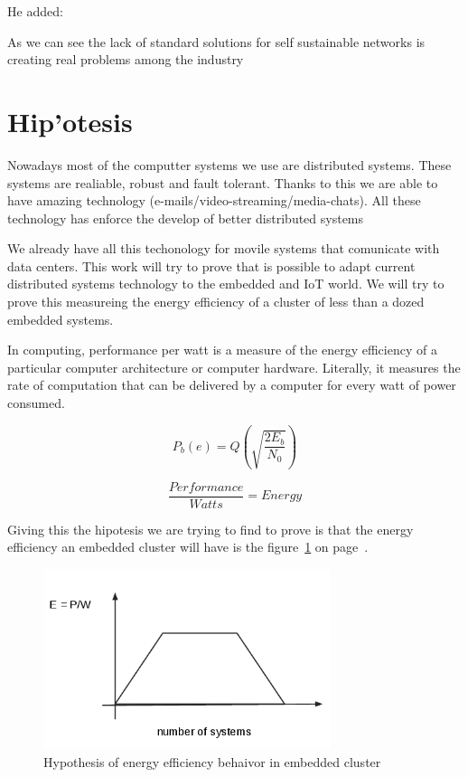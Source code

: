 He added: 


As we can see the lack of standard solutions for self sustainable networks is 
creating real problems among the industry

\section{Hip'otesis}
\noindent

Nowadays most of the computter systems we use are distributed systems. These
systems are realiable, robust and fault tolerant. Thanks to this we are able to
have amazing technology (e-mails/video-streaming/media-chats). All these
technology has enforce the develop of better distributed systems

We already have all this techonology for movile systems that comunicate with
data centers. This work will try to prove that is possible to adapt current
distributed systems technology to the embedded and IoT world. We will try to
prove this measureing the energy efficiency of a cluster of less than a dozed 
embedded systems. 

In computing, performance per watt is a measure of the energy efficiency of a
particular computer architecture or computer hardware. Literally, it measures
the rate of computation that can be delivered by a computer for every watt of
power consumed. 


\[P_b(e)=Q\left(\sqrt{\frac{2E_b}{N_0}}\right)\]

\begin{equation}
    \dfrac {Performance}{Watts} = Energy
\end{equation}

Giving this the hipotesis we are trying to find to prove is that the energy
efficiency an embedded cluster will have is the 
figure~\ref{fig:1.2} on page~\pageref{fig:1.2}.


\begin{figure}[H]
\centering
\includegraphics[width=0.75\textwidth]{images/graph_1.png}
\caption{Hypothesis of energy efficiency behaivor in embedded cluster}
\label{fig:1.2}
\end{figure}

